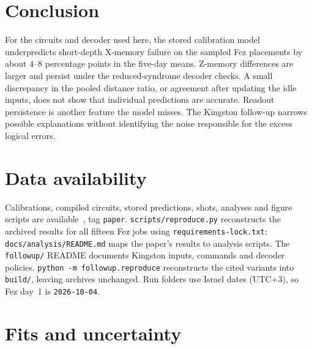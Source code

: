 \documentclass[aps,pra,reprint,nofootinbib,longbibliography,floatfix,showkeys]{revtex4-2}
\begin{document}
\section{Conclusion}
\label{sec:conclusion}

For the circuits and decoder used here, the stored calibration model underpredicts short-depth X-memory failure on the sampled Fez placements by about 4--8 percentage points in the five-day means.
Z-memory differences are larger and persist under the reduced-syndrome decoder checks.
A small discrepancy in the pooled distance ratio, or agreement after updating the idle inputs, does not show that individual predictions are accurate.
Readout persistence is another feature the model misses.
The Kingston follow-up narrows possible explanations without identifying the noise responsible for the excess logical errors.

\section*{Data availability}
Calibrations, compiled circuits, stored predictions, shots, analyses and figure scripts are available~\cite{repo}, tag \texttt{paper}.
\texttt{scripts/reproduce.py} reconstructs the archived results for all fifteen Fez jobs using \texttt{requirements-lock.txt}; \texttt{docs/analysis/README.md} maps the paper's results to analysis scripts.
The \texttt{followup/} README documents Kingston inputs, commands and decoder policies. \texttt{python -m followup.reproduce} reconstructs the cited variants into \texttt{build/}, leaving archives unchanged.
Run folders use Israel dates (UTC+3), so Fez day~1 is \texttt{2026-10-04}.

\clearpage
\appendix
\makeatletter
{}
\makeatother
\renewcommand{\thetable}{\Alph{section}\arabic{table}}
\renewcommand{\theHtable}{\Alph{section}\arabic{table}}
\renewcommand{\thefigure}{\Alph{section}\arabic{figure}}
\renewcommand{\theHfigure}{\Alph{section}\arabic{figure}}

\section{Fits and uncertainty}
\label{app:stats}
\end{document}
